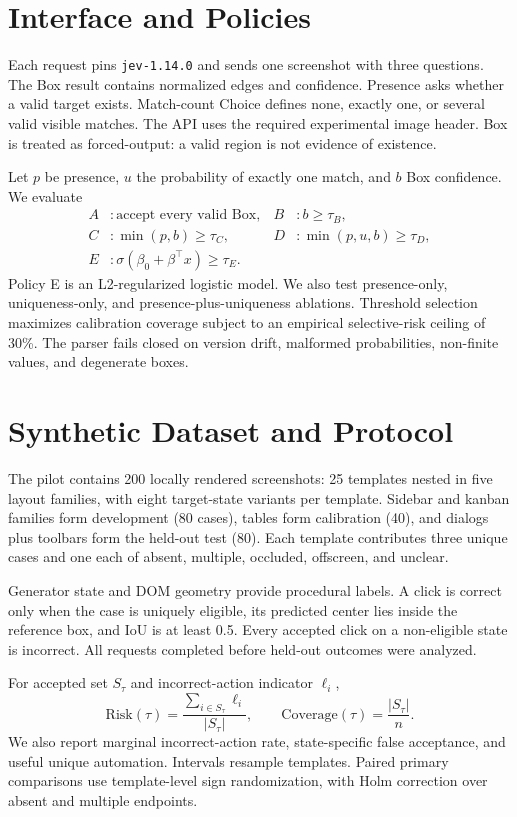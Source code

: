 \documentclass[10pt,twocolumn]{article}
\newcommand{\risk}{\mathrm{Risk}}
\newcommand{\coverage}{\mathrm{Coverage}}
\begin{document}
\section{Interface and Policies}
Each request pins \texttt{jev-1.14.0} and sends one screenshot with three questions. The Box result contains normalized edges and confidence. Presence asks whether a valid target exists. Match-count Choice defines none, exactly one, or several valid visible matches. The API uses the required experimental image header. Box is treated as forced-output: a valid region is not evidence of existence.

Let $p$ be presence, $u$ the probability of exactly one match, and $b$ Box confidence. We evaluate
\begin{align*}
A &: \text{accept every valid Box}, & B &: b\ge \tau_B,\\
C &: \min(p,b)\ge \tau_C, & D &: \min(p,u,b)\ge \tau_D,\\
E &: \sigma(\beta_0+\beta^\top x)\ge \tau_E. &&
\end{align*}
Policy E is an L2-regularized logistic model. We also test presence-only, uniqueness-only, and presence-plus-uniqueness ablations. Threshold selection maximizes calibration coverage subject to an empirical selective-risk ceiling of 30\%. The parser fails closed on version drift, malformed probabilities, non-finite values, and degenerate boxes.

\section{Synthetic Dataset and Protocol}
The pilot contains 200 locally rendered screenshots: 25 templates nested in five layout families, with eight target-state variants per template. Sidebar and kanban families form development (80 cases), tables form calibration (40), and dialogs plus toolbars form the held-out test (80). Each template contributes three unique cases and one each of absent, multiple, occluded, offscreen, and unclear.

Generator state and DOM geometry provide procedural labels. A click is correct only when the case is uniquely eligible, its predicted center lies inside the reference box, and IoU is at least 0.5. Every accepted click on a non-eligible state is incorrect. All requests completed before held-out outcomes were analyzed.

For accepted set $S_\tau$ and incorrect-action indicator $\ell_i$,
\[
\risk(\tau)=\frac{\sum_{i\in S_\tau}\ell_i}{|S_\tau|},\qquad
\coverage(\tau)=\frac{|S_\tau|}{n}.
\]
We also report marginal incorrect-action rate, state-specific false acceptance, and useful unique automation. Intervals resample templates. Paired primary comparisons use template-level sign randomization, with Holm correction over absent and multiple endpoints.
\end{document}

